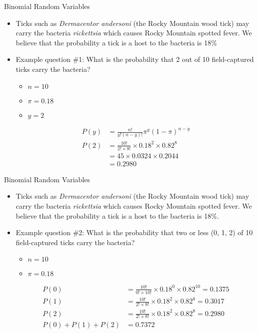 \documentclass[xcolor=dvipsnames]{beamer}
\begin{document}
\begin{frame}{Binomial Random Variables}
	\begin{itemize}
		\item Ticks such as \emph{Dermacentor andersoni} (the Rocky Mountain wood tick) may carry the bacteria \emph{rickettsia} which causes Rocky Mountain spotted fever. We believe that the probability a tick is a host to the bacteria is 18\% \pause
		\item Example question \#1: What is the probability that 2 out of 10 field-captured ticks carry the bacteria? \pause
		\begin{itemize}
			\item $n = 10$
			\item $\pi = 0.18$
			\item $y = 2$
		\end{itemize} \pause
		\begin{align*}
			P(y) &= \frac{n!}{y!(n-y)!} \pi^y (1-\pi)^{n-y} \\
			P(2) &= \frac{10!}{2! \times 8!} \times 0.18^{2} \times 0.82^{8} \\
			&= 45 \times 0.0324 \times 0.2044 \\
			&= 0.2980
 		\end{align*}
	\end{itemize}
\end{frame}

\begin{frame}{Binomial Random Variables}
	\begin{itemize}
		\item Ticks such as \emph{Dermacentor andersoni} (the Rocky Mountain wood tick) may carry the bacteria \emph{rickettsia} which causes Rocky Mountain spotted fever. We believe that the probability a tick is a host to the bacteria is 18\%. \pause
		\item Example question \#2: What is the probability that two or less (0, 1, 2) of 10 field-captured ticks carry the bacteria? \pause
		\begin{itemize}
			\item $n = 10$
			\item $\pi = 0.18$
		\end{itemize} \pause
		\begin{align*}
		P(0) &= \frac{10!}{0! \times 10!} \times 0.18^{0} \times 0.82^{10} = 0.1375 \\
		P(1) &= \frac{10!}{2! \times 8!} \times 0.18^{2} \times 0.82^{8} = 0.3017 \\
		P(2) &= \frac{10!}{2! \times 8!} \times 0.18^{2} \times 0.82^{8} = 0.2980\\
		P(0) + P(1) + P(2) &= 0.7372
		\end{align*}
	\end{itemize}
\end{frame}
\end{document}
